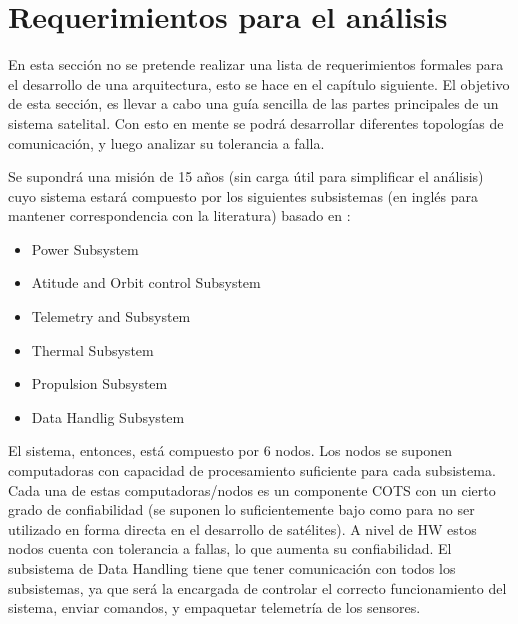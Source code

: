 \section{Requerimientos para el análisis}
En esta sección no se pretende realizar una lista de requerimientos formales para el desarrollo de una arquitectura, esto se hace en el capítulo siguiente. El objetivo de esta sección, es llevar a cabo una guía sencilla de las partes principales de un sistema satelital. Con esto en mente se podrá desarrollar diferentes topologías de comunicación, y luego analizar su tolerancia a falla.

Se supondrá una misión de 15 años (sin carga útil para simplificar el análisis) cuyo sistema estará compuesto por los siguientes subsistemas (en inglés para mantener correspondencia con la literatura) basado en \cite{Fontescue03}:
\begin{itemize}
\item Power Subsystem
\item Atitude and Orbit control Subsystem
\item Telemetry and Subsystem
\item Thermal Subsystem
\item Propulsion Subsystem
\item Data Handlig Subsystem
\end{itemize}

El sistema, entonces, está compuesto por 6 nodos. Los nodos se suponen computadoras con capacidad de procesamiento suficiente para cada subsistema. Cada una de estas computadoras/nodos es un componente COTS con un cierto grado de confiabilidad (se suponen lo suficientemente bajo como para no ser utilizado en forma directa en el desarrollo de satélites). A nivel de \ac{HW} estos nodos cuenta con tolerancia a fallas, lo que aumenta su confiabilidad. El subsistema de Data Handling tiene que tener comunicación con todos los subsistemas, ya que será la encargada de controlar el correcto funcionamiento del sistema, enviar comandos, y empaquetar telemetría de los sensores.



